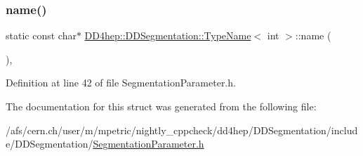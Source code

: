 \subsubsection{\texorpdfstring{name()}{name()}}
{\footnotesize\ttfamily static const char$\ast$ \hyperlink{struct_d_d4hep_1_1_d_d_segmentation_1_1_type_name}{D\+D4hep\+::\+D\+D\+Segmentation\+::\+Type\+Name}$<$ int $>$\+::name (\begin{DoxyParamCaption}{ }\end{DoxyParamCaption})\hspace{0.3cm}{\ttfamily [inline]}, {\ttfamily [static]}}



Definition at line 42 of file Segmentation\+Parameter.\+h.



The documentation for this struct was generated from the following file\+:\begin{DoxyCompactItemize}
\item 
/afs/cern.\+ch/user/m/mpetric/nightly\+\_\+cppcheck/dd4hep/\+D\+D\+Segmentation/include/\+D\+D\+Segmentation/\hyperlink{_segmentation_parameter_8h}{Segmentation\+Parameter.\+h}\end{DoxyCompactItemize}
